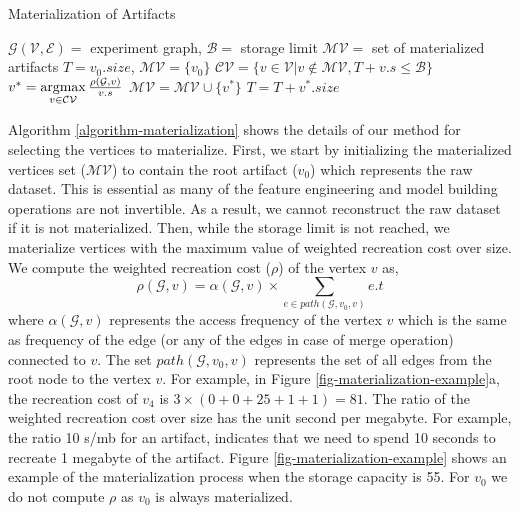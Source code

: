 \begin{algorithm}[h]
\caption{Materialization of Artifacts}\label{algorithm-materialization}
\begin{algorithmic}[1]
\Require  $\mathcal{G(V,E)}=$ experiment graph, $\mathcal{B}=$ storage limit
\Ensure $\mathcal{MV}=$ set of materialized artifacts
\State $T=v_0.size$, $\mathcal{MV} =\{v_0\}$
\Do 
	\State $\mathcal{CV} = \{v \in \mathcal{V} \lvert v \notin \mathcal{MV}, T + v.s \leq \mathcal{B}\}$
	\State $v^* = \operatorname*{argmax}\limits_{v \in \mathcal{CV}} \tfrac{\rho(\mathcal{G}, v)}{v.s}$
	\State $\mathcal{MV} = \mathcal{MV} \cup \{v^*\}$
	\State $T = T + v^*.size$
\end{algorithmic}
\end{algorithm}
Algorithm \ref{algorithm-materialization} shows the details of our method for selecting the vertices to materialize.
First, we start by initializing the materialized vertices set ($\mathcal{MV}$) to contain the root artifact ($v_0$) which represents the raw dataset.
This is essential as many of the feature engineering and model building operations are not invertible.
As a result, we cannot reconstruct the raw dataset if it is not materialized.
Then, while the storage limit is not reached, we materialize vertices with the maximum value of weighted recreation cost over size.
We compute the weighted recreation cost ($\rho$) of the vertex $v$ as, 
\[
\rho(\mathcal{G}, v) = \alpha(\mathcal{G}, v) \times \sum\limits_{e \in path(\mathcal{G}, v_0, v)}  e.t
\]
where $\alpha(\mathcal{G}, v)$ represents the access frequency of the vertex $v$ which is the same as frequency of the edge (or any of the edges in case of merge operation) connected to $v$.
The set $path(\mathcal{G}, v_0, v)$ represents the set of all edges from the root node to the vertex $v$. 
For example, in Figure \ref{fig-materialization-example}a, the recreation cost of $v_4$ is $3 \times (0 + 0 + 25 + 1 + 1) = 81$.
The ratio of the weighted recreation cost over size has the unit second per megabyte.
For example, the ratio 10 s/mb for an artifact, indicates that we need to spend 10 seconds to recreate 1 megabyte of the artifact.
Figure \ref{fig-materialization-example} shows an example of the materialization process when the storage capacity is 55.
For $v_0$ we do not compute $\rho$ as $v_0$ is always materialized.

